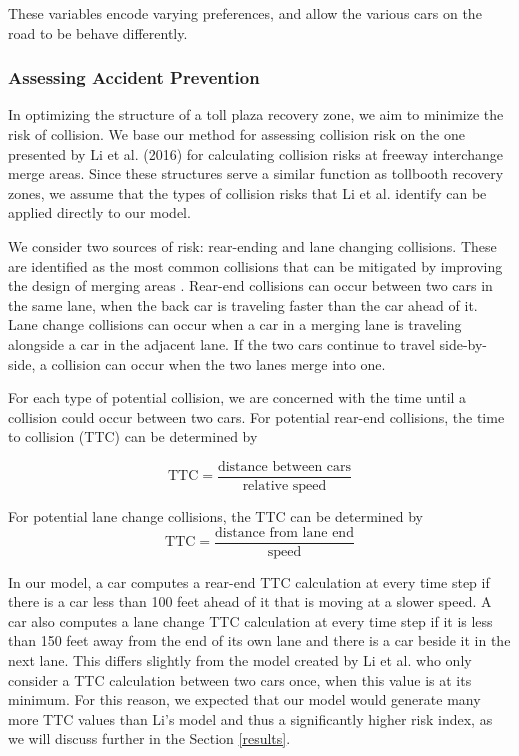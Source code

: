 \documentclass[a4paper, 11pt]{article}
\begin{document}
These variables encode varying preferences, and allow the various cars on the road to be behave differently. 

\subsubsection{Assessing Accident Prevention}
\label{collision_risk}



In optimizing the structure of a toll plaza recovery zone, we aim to minimize the risk of collision. We base our method for assessing collision risk on the one presented by Li et al. (2016) for calculating collision risks at freeway interchange merge areas. Since these structures serve a similar function as tollbooth recovery zones, we assume that the types of collision risks that Li et al. identify can be applied directly to our model. 

We consider two sources of risk: rear-ending and lane changing collisions. These are identified as the most common collisions that can be mitigated by improving the design of merging areas \cite{crashRisk}. Rear-end collisions can occur between two cars in the same lane, when the back car is traveling faster than the car ahead of it. Lane change collisions can occur when a car in a merging lane is traveling alongside a car in the adjacent lane. If the two cars continue to travel side-by-side, a collision can occur when the two lanes merge into one. 

For each type of potential collision, we are concerned with the time until a collision could occur between two cars. For potential rear-end collisions, the time to collision (TTC) can be determined by 

\begin{equation}
\mbox{TTC} = \frac{\mbox{distance between cars}}{\mbox{relative speed}}
\end{equation}

For potential lane change collisions, the TTC can be determined by
\begin{equation}
\mbox{TTC} = \frac{\mbox{distance from lane end}}{\mbox{speed}}
\end{equation}


In our model, a car computes a rear-end TTC calculation at every time step if there is a car less than 100 feet ahead of it that is moving at a slower speed. A car also computes a lane change TTC calculation at every time step if it is less than 150 feet away from the end of its own lane and there is a car beside it in the next lane. This differs slightly from the model created by Li et al. who only consider a TTC calculation between two cars once, when this value is at its minimum. For this reason, we expected that our model would generate many more TTC values than Li's model and thus a significantly higher risk index, as we will discuss further in the Section \ref{results}. 
\end{document}
